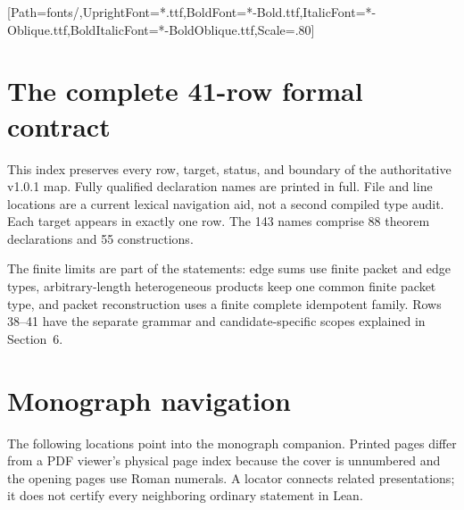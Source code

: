 

\usepackage{komorebi-monograph}
\renewcommand{\KomorebiKind}{Lean and evidence guide}
\renewcommand{\KomorebiShortTitle}{Paper III / Lean guide}
\renewcommand{\KomorebiCoverBlurb}{Read the exact source declarations, follow the map directions, and distinguish the preserved kernel evidence from current static checks.}
\KomorebiSetup
\setmonofont{DejaVuSansMono}[Path=fonts/,UprightFont=*.ttf,BoldFont=*-Bold.ttf,ItalicFont=*-Oblique.ttf,BoldItalicFont=*-BoldOblique.ttf,Scale=.80]

\KomorebiCover
{}


\tableofcontents
\clearpage
{}







\clearpage
\section{The complete 41-row formal contract}\label{sec:map}
This index preserves every row, target, status, and boundary of the authoritative v1.0.1 map. Fully qualified declaration names are printed in full. File and line locations are a current lexical navigation aid, not a second compiled type audit. Each target appears in exactly one row. The 143 names comprise 88 theorem declarations and 55 constructions.

The finite limits are part of the statements: edge sums use finite packet and edge types, arbitrary-length heterogeneous products keep one common finite packet type, and packet reconstruction uses a finite complete idempotent family. Rows 38--41 have the separate grammar and candidate-specific scopes explained in Section~6.

\clearpage
\appendix
\section{Monograph navigation}\label{app:crosswalk}
The following locations point into the monograph companion. Printed pages differ from a PDF viewer's physical page index because the cover is unnumbered and the opening pages use Roman numerals. A locator connects related presentations; it does not certify every neighboring ordinary statement in Lean.

